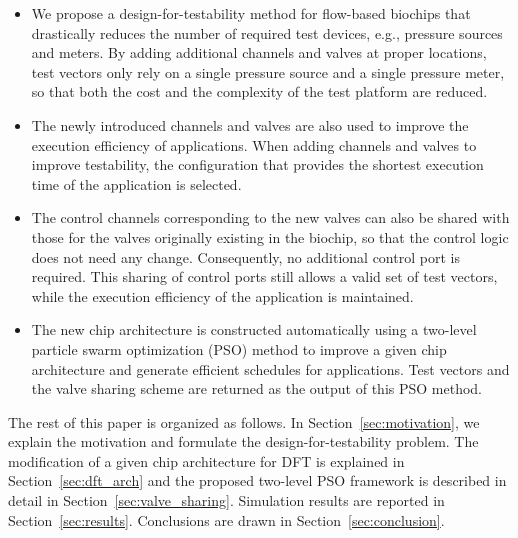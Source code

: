 \begin{itemize} 

    \newlength{\mylength} 
    \setlength\mylength{\parskip}
    \setlength\parskip{-3.5mm}

  \item 

  We propose a design-for-testability method for flow-based biochips that
  drastically 
  reduces the number of required test devices, e.g., pressure sources and
  meters. By adding additional channels and valves at proper locations, test
  vectors only rely on a single pressure source and a single pressure meter,
  so that both the cost and the complexity of the test platform are reduced. 

  \setlength\parskip{\mylength}
  \item 

   The newly introduced channels and valves are also used to improve the
   execution efficiency of applications. When adding channels and valves to
   improve testability, the configuration that provides the shortest execution
   time of the application is selected.  

 \item 

   The control channels corresponding to the
   new valves can also be shared with those for the valves
   originally existing in the biochip, so that the control logic does not need
   any change.  Consequently, no additional control port is required.
   This sharing of control ports still allows a valid set of test vectors,
   while the execution efficiency of the application is maintained.

   \item

   The new chip architecture is constructed automatically using a two-level
   particle swarm optimization (PSO) method 
   to improve a given chip architecture and generate efficient schedules for
   applications. Test vectors and the valve sharing scheme are returned as
   the output of this PSO method.

\end{itemize}

The rest of this paper is organized as follows. In
Section~\ref{sec:motivation}, we explain the motivation and formulate the
design-for-testability problem.  The modification of a given chip architecture
for DFT is explained in Section~\ref{sec:dft_arch} and the proposed two-level
PSO framework is described in detail in Section~\ref{sec:valve_sharing}.
Simulation results are reported in Section~\ref{sec:results}.  Conclusions
are drawn in Section~\ref{sec:conclusion}.
